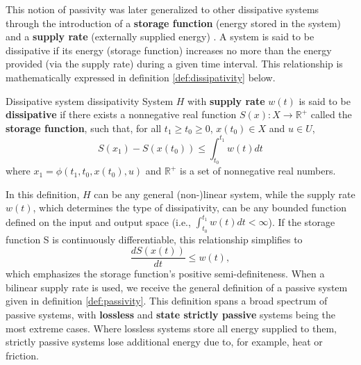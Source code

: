 This notion of passivity was later generalized to other dissipative systems through the introduction of a \textbf{storage function} (energy stored in the system) and a \textbf{supply rate} (externally supplied energy) \cite{willemsDissipativeDynamicalSystems1972a,willemsDissipativeDynamicalSystems1972}. A system is said to be dissipative if its energy (storage function) increases no more than the energy provided (via the supply rate) during a given time interval. This relationship is mathematically expressed in definition \ref{def:dissipativity} below.

\begin{definition}[list text=Dissipative system]{Dissipative system \cite{baoProcessControlPassive2007}}{dissipativity}
  System $H$ with \textbf{supply rate} $w \left( t \right)$ is said to be \textbf{dissipative} if there exists a nonnegative real function $S \left( x \right): X \rightarrow\mathbb{R}^+$ called the \textbf{storage function}, such that, for all $t_1 \geq t_0 \geq 0$, $x\left(t_0\right) \in X$ and $u \in U$,
  \begin{equation}
    S \left( x_1 \right)- S \left( x\left(t_0\right) \right) \le \int_{ t_0 }^{ t_1 } w \left( t \right) dt
  \end{equation}
  where $x_1 = \phi \left(t_1, t_0, x\left(t_0\right), u \right)$ and $\mathbb{R}^+$ is a set of nonnegative real numbers.
\end{definition}

In this definition, $H$ can be any general (non-)linear system, while the supply rate $w \left( t \right)$, which determines the type of dissipativity, can be any bounded function defined on the input and output space (i.e., $\int_{ t_0 }^{ t_1 } w \left( t \right)dt<\infty$). If the storage function S is continuously differentiable, this relationship simplifies to
\begin{equation}
  \frac{ dS \left( x \left( t \right)\right)}{ dt }\le w \left( t \right),
\end{equation}
which emphasizes the storage function's positive semi-definiteness. When a bilinear supply rate is used, we receive the general definition of a passive system given in definition \ref{def:passivity}. This definition spans a broad spectrum of passive systems, with \textbf{lossless} and \textbf{state strictly passive} systems being the most extreme cases. Where lossless systems store all energy supplied to them, strictly passive systems lose additional energy due to, for example, heat or friction.

